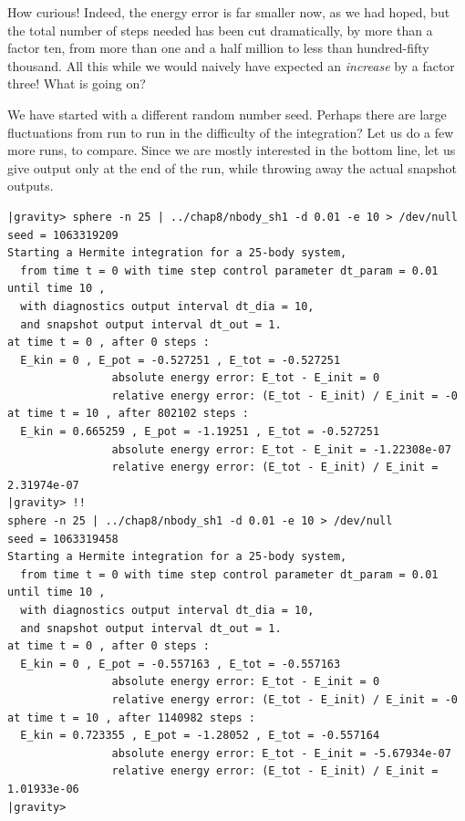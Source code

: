 \abc

\bob
How curious!  Indeed, the energy error is far smaller now, as we had
hoped, but the total number of steps needed has been cut dramatically,
by more than a factor ten, from more than one and a half million to
less than hundred-fifty thousand.  All this while we would naively have
expected an {\it increase} by a factor three!  What is going on?

\alice
We have started with a different random number seed.  Perhaps there
are large fluctuations from run to run in the difficulty of the
integration?  Let us do a few more runs, to compare.  Since we are
mostly interested in the bottom line, let us give output only at the
end of the run, while throwing away the actual snapshot outputs.

\cba

\begin{small}
\begin{verbatim}
|gravity> sphere -n 25 | ../chap8/nbody_sh1 -d 0.01 -e 10 > /dev/null
seed = 1063319209
Starting a Hermite integration for a 25-body system,
  from time t = 0 with time step control parameter dt_param = 0.01  until time 10 ,
  with diagnostics output interval dt_dia = 10,
  and snapshot output interval dt_out = 1.
at time t = 0 , after 0 steps :
  E_kin = 0 , E_pot = -0.527251 , E_tot = -0.527251
                absolute energy error: E_tot - E_init = 0
                relative energy error: (E_tot - E_init) / E_init = -0
at time t = 10 , after 802102 steps :
  E_kin = 0.665259 , E_pot = -1.19251 , E_tot = -0.527251
                absolute energy error: E_tot - E_init = -1.22308e-07
                relative energy error: (E_tot - E_init) / E_init = 2.31974e-07
|gravity> !!
sphere -n 25 | ../chap8/nbody_sh1 -d 0.01 -e 10 > /dev/null
seed = 1063319458
Starting a Hermite integration for a 25-body system,
  from time t = 0 with time step control parameter dt_param = 0.01  until time 10 ,
  with diagnostics output interval dt_dia = 10,
  and snapshot output interval dt_out = 1.
at time t = 0 , after 0 steps :
  E_kin = 0 , E_pot = -0.557163 , E_tot = -0.557163
                absolute energy error: E_tot - E_init = 0
                relative energy error: (E_tot - E_init) / E_init = -0
at time t = 10 , after 1140982 steps :
  E_kin = 0.723355 , E_pot = -1.28052 , E_tot = -0.557164
                absolute energy error: E_tot - E_init = -5.67934e-07
                relative energy error: (E_tot - E_init) / E_init = 1.01933e-06
|gravity>
\end{verbatim}
\end{small}

